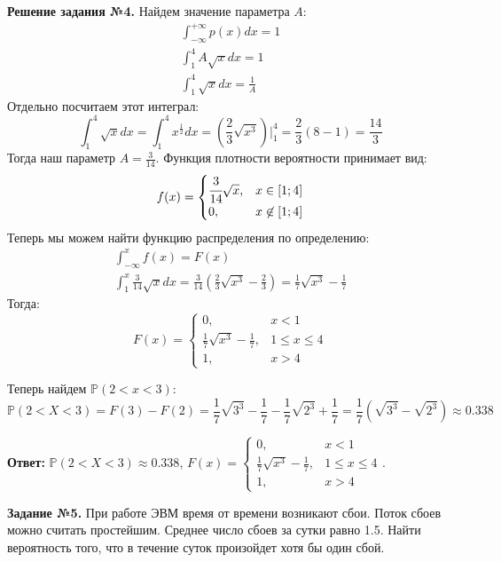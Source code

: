 \documentclass[a4paper, 12pt]{article}
\begin{document}
\textbf{Решение задания №4.} Найдем значение параметра $A$:
\begin{gather*}
    \int_{-\infty}^{+\infty} p(x)  dx = 1 \\ 
    \int_{1}^{4} A \sqrt{x} dx = 1 \\ 
    \int_{1}^{4} \sqrt{x} dx = \frac{1}{A}
\end{gather*}
Отдельно посчитаем этот интеграл:
\[
    \int_{1}^{4} \sqrt{x} dx = \int_{1}^{4} x^{\frac{1}{2}} dx = \left( \frac{2}{3} \sqrt{x^3} \right) \Bigg |_1^4 = \frac{2}{3} (8 - 1) = \frac{14}{3}
\]
Тогда наш параметр $A = \frac{3}{14}$. Функция плотности вероятности принимает вид:
\[
f(x) = 
\begin{cases}
    \cfrac{3}{14} \sqrt{x}, & x \in [1; 4] \\ 
    0, & x \not \in [1; 4]
\end{cases}
\]
Теперь мы можем найти функцию распределения по определению:
\begin{gather*}
    \int_{-\infty}^x f(x) = F(x) \\ 
    \int_{1}^x \frac{3}{14} \sqrt{x} dx = \frac{3}{14} \left( \frac{2}{3} \sqrt{x^3} - \frac{2}{3} \right) = \frac{1}{7} \sqrt{x^3} - \frac{1}{7}
\end{gather*}
Тогда:
\[
F(x) = 
\begin{cases}
    0, & x < 1 \\
    \frac{1}{7} \sqrt{x^3} - \frac{1}{7}, & 1 \le x \le 4 \\ 
    1, & x > 4
\end{cases}
\]

Теперь найдем $\mathbb{P}(2 < x < 3)$:
\[
    \mathbb{P}(2 < X < 3) = F(3) - F(2) =  \frac{1}{7} \sqrt{3^3} - \frac{1}{7} -  \frac{1}{7} \sqrt{2^3} + \frac{1}{7} = \frac{1}{7} \left( \sqrt{3^3} - \sqrt{2^3} \right) \approx 0.338
\] 

\textbf{Ответ: } $\mathbb{P}(2 < X < 3) \approx 0.338$, 
$F(x) = 
\begin{cases}
    0, & x < 1 \\
    \frac{1}{7} \sqrt{x^3} - \frac{1}{7}, & 1 \le x \le 4 \\ 
    1, & x > 4
\end{cases}.
$

\newpage 

\textbf{Задание №5.} При работе ЭВМ время от времени возникают сбои. Поток сбоев можно считать простейшим. Среднее число сбоев за сутки равно 1.5. Найти вероятность того, что в течение суток произойдет хотя бы один сбой.
\end{document}
